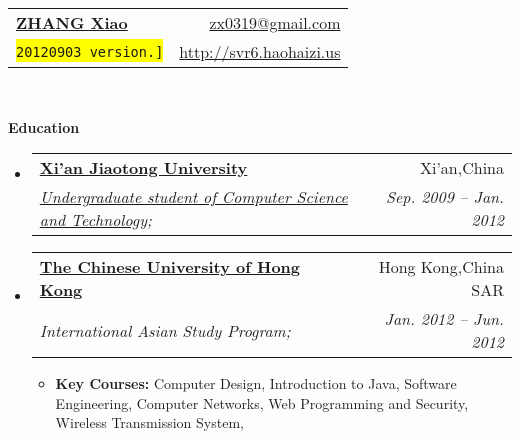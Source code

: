 \documentclass[letterpaper,11pt]{article}
\makeatletter
\newcommand{\resitem}[1]{\item #1 \vspace{-2pt}}
\newcommand{\resheading}[1]{{\large \colorbox{mygrey}{\begin{minipage}{\textwidth}{\textbf{#1 \vphantom{p\^{E}}}}\end{minipage}}}}
\newcommand{\ressubheading}[4]{
\begin{tabular*}{6.5in}{l@{\extracolsep{\fill}}r}
		\textbf{#1} & #2 \\
		\textit{#3} & \textit{#4} \\
\end{tabular*}\vspace{-6pt}}
\makeatother
\begin{document}
\newcommand{\mywebheader}{
\begin{tabular*}{7in}{l@{\extracolsep{\fill}}r}
	\textbf{\href{http://svr6.haohaizi.us/}{\LARGE ZHANG Xiao}} & \href{mailto:zx0319@gmail.com}{zx0319@gmail.com}\\
	{\footnotesize \texttt{\colorbox{yellow}{20120903 version.]}}} & \href{http://svr6.haohaizi.us}{http://svr6.haohaizi.us} \\
	\end{tabular*}
\\
\vspace{0.1in}}

\mywebheader

\resheading{Education}
	\begin{itemize}
		\item
			\ressubheading{\href{http://www.xjtu.edu.cn}{Xi'an Jiaotong University}}{Xi'an,China}{\href{http://www.cs.xjtu.edu.cn}{Undergraduate student of Computer Science and Technology};}{Sep. 2009 -- Jan. 2012}
			
		\item
			\ressubheading{\href{http://www.cuhk.edu.hk}{The Chinese University of Hong Kong}}{Hong Kong,China SAR}{{International Asian Study Program};}{Jan. 2012 -- Jun. 2012}
				{ \footnotesize
				\begin{itemize}
					\resitem
					{\textbf{Key Courses:}
						{Computer Design},
						{Introduction to Java},
						{Software Engineering},
						{Computer Networks},
						{Web Programming and Security},
						{Wireless Transmission System},
					}
				\end{itemize}
			}
	\end{itemize} %
\end{document}
